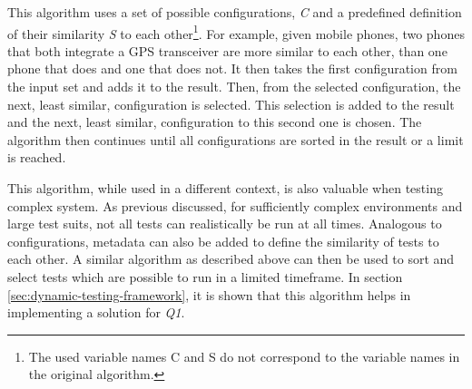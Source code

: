 This algorithm uses a set of possible configurations, \textit{C} and a predefined definition of their similarity \textit{S} to each other\footnote{The used variable names C and S do not correspond to the variable names in the original algorithm.}.
For example, given mobile phones, two phones that both integrate a GPS transceiver are more similar to each other, than one phone that does and one that does not.
It then takes the first configuration from the input set and adds it to the result.
Then, from the selected configuration, the next, least similar, configuration is selected.
This selection is added to the result and the next, least similar, configuration to this second one is chosen.
The algorithm then continues until all configurations are sorted in the result or a limit is reached.

This algorithm, while used in a different context, is also valuable when testing complex system.
As previous discussed, for sufficiently complex environments and large test suits, not all tests can realistically be run at all times.
Analogous to configurations, metadata can also be added to define the similarity of tests to each other.
A similar algorithm as described above can then be used to sort and select tests which are possible to run in a limited timeframe.
In section \ref{sec:dynamic-testing-framework}, it is shown that this algorithm helps in implementing a solution for \textit{Q1}.

